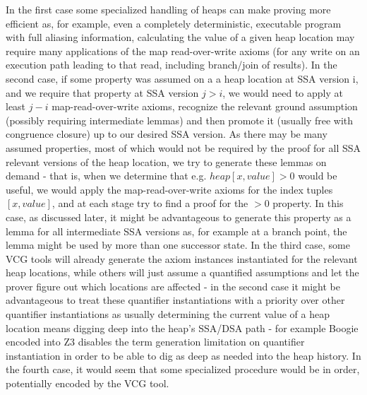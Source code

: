 		In the first case some specialized handling of heaps can make proving more efficient as, for example, even a completely deterministic, executable program with full aliasing information, calculating the value of a given heap location may require many applications of the map read-over-write axioms (for any write on an execution path leading to that read, including branch/join of results).
		In the second case, if some property was assumed on a a heap location at SSA version i, and we require that property at SSA version $j>i$, we would need to apply at least $j-i$ map-read-over-write axioms, recognize the relevant ground assumption (possibly requiring intermediate lemmas) and then promote it (usually free with congruence closure) up to our desired SSA version.
		As there may be many assumed properties, most of which would not be required by the proof for all SSA relevant versions of the heap location, we try to generate these lemmas on demand - that is, when we determine that e.g. $heap[x,value]>0$ would be useful, we would apply the map-read-over-write axioms for the index tuples $[x,value]$, and at each stage try to find a proof for the $>0$ property.
		In this case, as discussed later, it might be advantageous to generate this property as a lemma for all intermediate SSA versions as, for example at a branch point, the lemma might be used by more than one successor state.
		In the third case, some VCG tools will already generate the axiom instances instantiated for the relevant heap locations, while others will just assume a quantified assumptions and let the prover figure out which locations are affected - in the second case it might be advantageous to treat these quantifier instantiations with a priority over other quantifier instantiations as usually determining the current value of a heap location means digging deep into the heap's SSA/DSA path - for example Boogie encoded into Z3 disables the term generation limitation on quantifier instantiation in order to be able to dig as deep as needed into the heap history.
		In the fourth case, it would seem that some specialized procedure would be in order, potentially encoded by the VCG tool.
